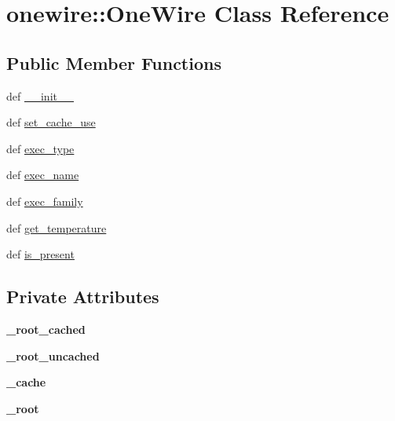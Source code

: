 \hypertarget{classonewire_1_1OneWire}{
\section{onewire::OneWire Class Reference}
\label{classonewire_1_1OneWire}
}
\subsection*{Public Member Functions}
\begin{CompactItemize}
\item 
def \hyperlink{classonewire_1_1OneWire_effc317af881a97edf6d7dd77c63b88c}{\_\-\_\-init\_\-\_\-}
\item 
def \hyperlink{classonewire_1_1OneWire_41228b6b8c1562f02d0b40c8e40d96b4}{set\_\-cache\_\-use}
\item 
def \hyperlink{classonewire_1_1OneWire_8c52e866328b82976eb9f799f891f487}{exec\_\-type}
\item 
def \hyperlink{classonewire_1_1OneWire_db399d215bf72b5084d5cbbefbdd62a9}{exec\_\-name}
\item 
def \hyperlink{classonewire_1_1OneWire_23324150ab22b72b6c32054003b400fd}{exec\_\-family}
\item 
def \hyperlink{classonewire_1_1OneWire_ece120e9964b38335bf23a7028d45083}{get\_\-temperature}
\item 
def \hyperlink{classonewire_1_1OneWire_a39fa5e62e0d65e62a915eb334d54fed}{is\_\-present}
\end{CompactItemize}
\subsection*{Private Attributes}
\begin{CompactItemize}
\item 
\hypertarget{classonewire_1_1OneWire_40f37588fd8a7fb0ac894db039ce1957}{
\textbf{\_\-root\_\-cached}}
\label{classonewire_1_1OneWire_40f37588fd8a7fb0ac894db039ce1957}

\item 
\hypertarget{classonewire_1_1OneWire_e2458b6e1c97fa036e57367bacdfe2d5}{
\textbf{\_\-root\_\-uncached}}
\label{classonewire_1_1OneWire_e2458b6e1c97fa036e57367bacdfe2d5}

\item 
\hypertarget{classonewire_1_1OneWire_f75836fcd181ffa0e98c7d3e5b9c25af}{
\textbf{\_\-cache}}
\label{classonewire_1_1OneWire_f75836fcd181ffa0e98c7d3e5b9c25af}

\item 
\hypertarget{classonewire_1_1OneWire_1165b31792f0a8955d26b55d524f58bf}{
\textbf{\_\-root}}
\label{classonewire_1_1OneWire_1165b31792f0a8955d26b55d524f58bf}

\end{CompactItemize}


